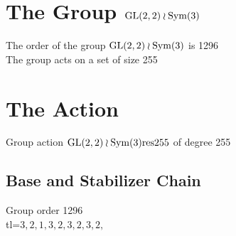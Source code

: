 \section*{The Group ${\rm GL}(2,2) \wr {\rm Sym}(3)$}
\noindent The order of the group ${\rm GL}(2,2) \wr {\rm Sym}(3)$ is 1296\\
\noindent The group acts on a set of size 255\\
\section*{The Action}
Group action ${\rm GL}(2,2) \wr {\rm Sym}(3) {\rm res255}$ of degree 255\\
\subsection*{Base and Stabilizer Chain}
Group order 1296\\
tl=$3, 2, 1, 3, 2, 3, 2, 3, 2, $\\
